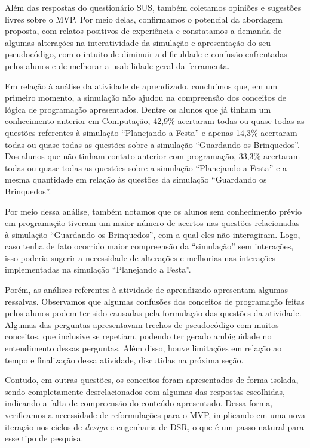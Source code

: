 Além das respostas do questionário SUS, também coletamos opiniões e sugestões livres sobre o MVP. Por meio delas, confirmamos o potencial da abordagem proposta, com relatos positivos de experiência e constatamos a demanda de algumas alterações na interatividade da simulação e apresentação do seu pseudocódigo, com o intuito de diminuir a dificuldade e confusão enfrentadas pelos alunos e de melhorar a usabilidade geral da ferramenta.

Em relação à análise da atividade de aprendizado, concluímos que, em um primeiro momento, a simulação não ajudou na compreensão dos conceitos de lógica de programação apresentados. Dentre os alunos que já tinham um conhecimento anterior em Computação, 42,9\% acertaram todas ou quase todas as questões referentes à simulação \enquote{Planejando a Festa} e apenas 14,3\% acertaram todas ou quase todas as questões sobre a simulação \enquote{Guardando os Brinquedos}. Dos alunos que não tinham contato anterior com programação, 33,3\% acertaram todas ou quase todas as questões sobre a simulação \enquote{Planejando a Festa} e a mesma quantidade em relação às questões da simulação \enquote{Guardando os Brinquedos}.

Por meio dessa análise, também notamos que os alunos sem conhecimento prévio em programação tiveram um maior número de acertos nas questões relacionadas à simulação \enquote{Guardando os Brinquedos}, com a qual eles não interagiram. Logo, caso tenha de fato ocorrido maior compreensão da \enquote{simulação} sem interações, isso poderia sugerir a necessidade de alterações e melhorias nas interações implementadas na simulação \enquote{Planejando a Festa}.

Porém, as análises referentes à atividade de aprendizado apresentam algumas ressalvas. Observamos que algumas confusões dos conceitos de programação feitas pelos alunos podem ter sido causadas pela formulação das questões da atividade. Algumas das perguntas apresentavam trechos de pseudocódigo com muitos conceitos, que inclusive se repetiam, podendo ter gerado ambiguidade no entendimento dessas perguntas. Além disso, houve limitações em relação ao tempo e finalização dessa atividade, discutidas na próxima seção.

Contudo, em outras questões, os conceitos foram apresentados de forma isolada, sendo completamente desrelacionados com algumas das respostas escolhidas, indicando a falta de compreensão do conteúdo apresentado. Dessa forma, verificamos a necessidade de reformulações para o MVP, implicando em uma nova iteração nos ciclos de \textit{design} e engenharia de DSR, o que é um passo natural para esse tipo de pesquisa.

